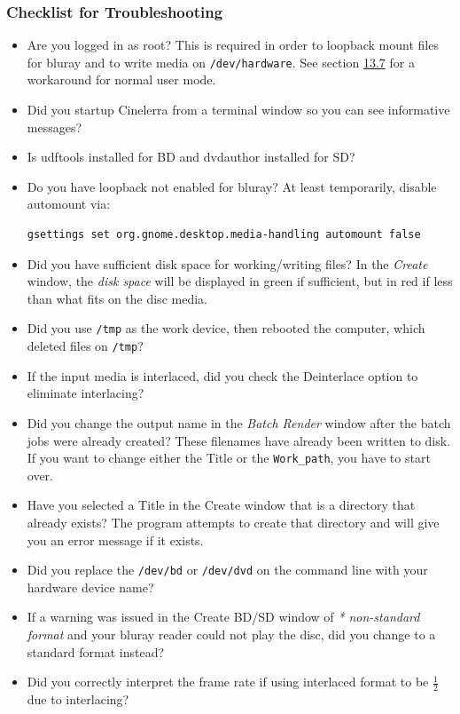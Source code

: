 \subsubsection*{Checklist for Troubleshooting}
\label{ssub:checklist_troubleshooting}

\begin{itemize}
    \item Are you logged in as root?  This is required in order to loopback mount files for bluray and to write media on \texttt{/dev/hardware}.  See section \hyperref[sec:bluray_workaround_mount_umount]{13.7} for a workaround for normal user mode.
    \item Did you startup Cinelerra from a terminal window so you can see informative messages?
    \item Is udftools installed for BD and dvdauthor installed for SD?
    \item Do you have loopback not enabled for bluray?  At least temporarily, disable automount via:
    \begin{lstlisting}[language=bash,numbers=none]
    gsettings set org.gnome.desktop.media-handling automount false
    \end{lstlisting}
    \item Did you have sufficient disk space for working/writing files?  In the \textit{Create} window, the \textit{disk space} will be displayed in green if sufficient, but in red if less than what fits on the disc media.
    \item Did you use \texttt{/tmp} as the work device, then rebooted the computer, which deleted files on \texttt{/tmp}?
    \item If the input media is interlaced, did you check the Deinterlace option to eliminate interlacing?
    \item Did you change the output name in the \textit{Batch Render} window after the batch jobs were already created? These filenames have already been written to disk. If you want to change either the Title or the \texttt{Work\_path}, you have to start over.
    \item Have you selected a Title in the Create window that is a directory that already exists? The program attempts to create that directory and will give you an error message if it exists.
    \item Did you replace the \texttt{/dev/bd} or \texttt{/dev/dvd} on the command line with your hardware device name?
    \item If a warning was issued in the Create BD/SD window of \textit{* non-standard format} and your bluray reader could not play the disc, did you change to a standard format instead?
    \item Did you correctly interpret the frame rate if using interlaced format to be $\frac{1}{2}$ due to interlacing?
\end{itemize}

